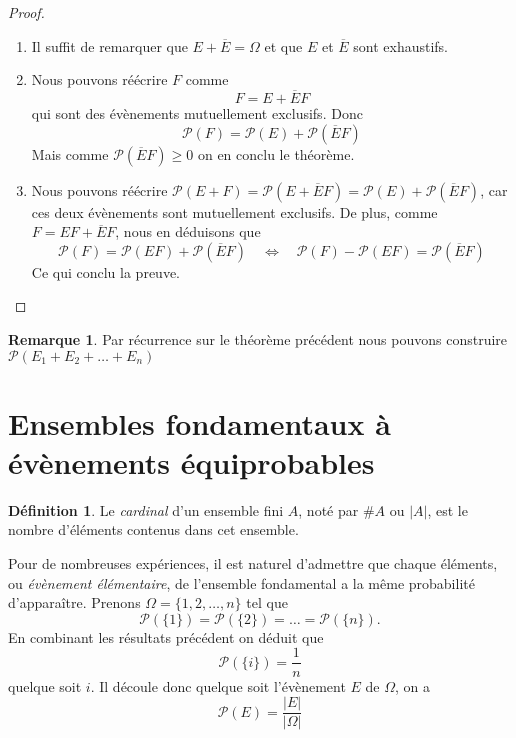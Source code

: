 \documentclass[a4paper,12pt]{report}
\theoremstyle{definition}
\renewcommand{\(}{\left(}
\renewcommand{\)}{\right)}
\renewcommand{\P}{\mathcal{P}}
\renewcommand{\d}{\textit}
\renewcommand{\bar}{\overline}
\newtheorem{defn}[thm]{Définition}
\newtheorem{rmk}[thm]{Remarque}
\begin{document}
    \begin{proof}
        ${}$
        \begin{enumerate}[label = (\roman*)]
            \item Il suffit de remarquer que $E + \bar{E} = \Omega$ et que $E$ et $\bar{E}$ sont exhaustifs.
            \item  Nous pouvons réécrire $F$ comme 
            \begin{equation*}
                F = E + \bar{E}F
            \end{equation*}
            qui sont des évènements mutuellement exclusifs. Donc 
            \begin{equation*}
                \P(F) = \P(E) + \P(\bar{E}F)
            \end{equation*}
            Mais comme $\P(\bar{E}F) \ge 0$ on en conclu le théorème.
            \item Nous pouvons réécrire $\P(E+F) = \P(E + \bar{E}F) = \P(E) + \P(\bar{E}F)$, car ces deux évènements sont mutuellement exclusifs. De plus, comme $F = EF + \bar{E}F$, nous en déduisons que 
        $$\P(F) = \P(EF) + \P(\bar{E}F) \quad \Leftrightarrow \quad \P(F) -\P(EF) =  \P(\bar{E}F)$$
        Ce qui conclu la preuve.
        \end{enumerate}
    \end{proof}
    
    \begin{rmk}
        Par récurrence sur le théorème précédent nous pouvons construire $\P(E_1 + E_2 + \ldots + E_n)$    
    \end{rmk}
    
    \section{Ensembles fondamentaux à évènements équiprobables}
    
    \begin{leftbar}
        \begin{defn}
            Le \d{cardinal} d'un ensemble fini $A$, noté par $\#A$ ou $|A|$, est le nombre d'éléments contenus dans cet ensemble.
        \end{defn}
    \end{leftbar}
    
    Pour de nombreuses expériences, il est naturel d'admettre que chaque éléments, ou \textit{évènement élémentaire}, de l'ensemble fondamental a la même probabilité d'apparaître. Prenons $\Omega = \{1,2, \ldots, n\}$ tel que 
    $$\P(\{1\}) = \P(\{2\}) = \ldots = \P(\{n\}).$$
    En combinant les résultats précédent on déduit que 
    $$\P(\{i\}) = \frac{1}{n}$$
    quelque soit $i$. Il découle donc quelque soit l'évènement $E$ de $\Omega$, on a 
    $$\P(E) = \frac{|E|}{|\Omega|}$$
\end{document}
